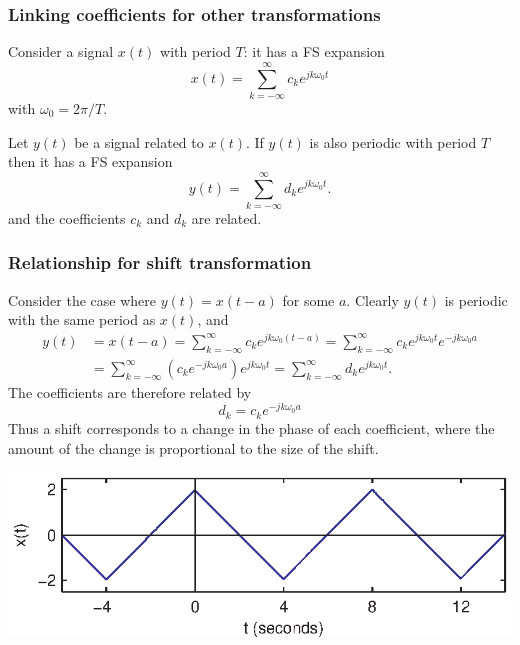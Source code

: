 \documentclass[10pt]{beamer}
\begin{document}
\begin{frame}
\frametitle{Linking coefficients for other transformations}
Consider a signal $x(t)$ with period $T$:  it has a FS expansion
\begin{equation*}
  x(t) = \sum_{k=-\infty}^\infty c_k e^{j k \omega_0 t}
\end{equation*}
with $\omega_0 = 2\pi/T$.

Let $y(t)$ be a signal related to $x(t)$.  If $y(t)$ is also
periodic with period $T$ then it has a FS expansion
\begin{equation*}
  y(t) = \sum_{k=-\infty}^\infty d_k e^{j k \omega_0 t}.
\end{equation*}
and the coefficients $c_k$ and $d_k$ are related.
\end{frame}

\begin{frame}
\frametitle{Relationship for shift transformation}
Consider the case where $y(t) = x(t-a)$ for some $a$.  Clearly
$y(t)$ is periodic with the same period as $x(t)$, and
\begin{align*}
  y(t) &= x(t-a) = \sum_{k=-\infty}^\infty c_k e^{j k \omega_0 (t-a)} 
  = \sum_{k=-\infty}^\infty c_k e^{j k \omega_0 t} e^{-j k \omega_0 a} \\
  &= \sum_{k=-\infty}^\infty (c_k e^{-j k \omega_0 a}) e^{j k \omega_0 t} 
  = \sum_{k=-\infty}^\infty d_k e^{j k \omega_0 t}.
\end{align*}
The coefficients are therefore related by
\begin{equation*}
  d_k = c_k e^{-j k \omega_0 a}
\end{equation*}
Thus a shift corresponds to a change in the phase of each coefficient, 
where the amount of the change is proportional to the size of the shift.
\end{frame}

\begin{frame}

\begin{center}
  \includegraphics{fs_add_fig08}
\end{center}
\end{frame}
\end{document}

